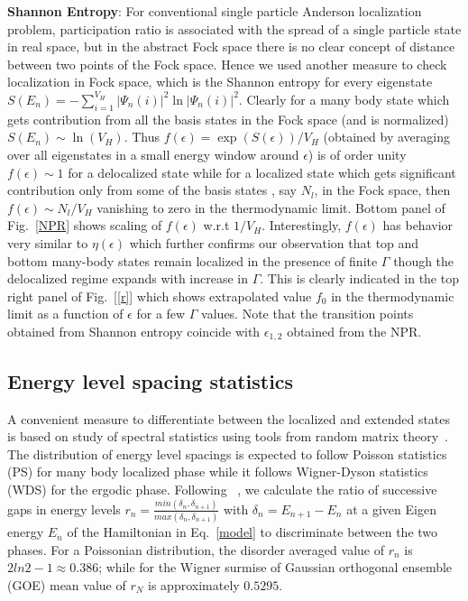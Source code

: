 \documentclass[prl,aps,twocolumn,floats,nofootinbib]{revtex4}
\begin{document}
{\bf{Shannon Entropy}}: For conventional single particle Anderson localization problem, participation ratio is associated with the spread of a single particle state in real space, but in the abstract Fock space there is no clear concept of distance between two points of the Fock space. Hence we used another measure to check localization in Fock space, which is the Shannon entropy for every eigenstate  $S(E_n)=-\sum_{i=1}^{V_H}|\Psi_n(i)|^2\ln|\Psi_n(i)|^2$. Clearly for a many body state which gets contribution from all the basis states in the Fock space (and is normalized) $S(E_n)\sim \ln(V_H)$. Thus $f(\epsilon)=\exp(S(\epsilon))/V_H$ (obtained by averaging over all eigenstates in a small energy window around $\epsilon$) is of  order unity $f(\epsilon) \sim 1$ for a delocalized state while for a localized state which gets significant contribution only from some of the basis states , say $N_l$, in the Fock space, then $f(\epsilon) \sim N_l/V_H$ vanishing to zero in the thermodynamic limit.
Bottom panel of Fig.~\ref{NPR} shows scaling of $f(\epsilon)$ w.r.t $1/V_H$. Interestingly, $f(\epsilon)$ has behavior very similar to $\eta(\epsilon)$ which further confirms our observation that top and bottom many-body states remain localized in the presence of finite $\Gamma$ though the delocalized regime expands with increase in $\Gamma$. This is clearly indicated in the top right panel of Fig.~[\ref{r}] which shows extrapolated value $f_0$ in the thermodynamic limit as a function of $\epsilon$ for a few $\Gamma$ values. Note that the transition points obtained from Shannon entropy coincide with $\epsilon_{1,2}$ obtained from the NPR.  

\subsection{Energy level spacing statistics}
A convenient measure to differentiate between the localized and extended states is based on study of spectral statistics using tools from random matrix theory~\cite{Mehta}. The distribution of energy level spacings is expected to follow Poisson statistics (PS) for many body localized phase while it follows Wigner-Dyson statistics (WDS) for the ergodic phase.  Following ~\cite{Husein}, we calculate the ratio of successive gaps in energy levels $r_n=\frac{min(\delta_n,\delta_{n+1})}{max(\delta_n,\delta_{n+1})}$ with $\delta_n=E_{n+1}-E_{n}$ at a given Eigen energy $E_n$ of the Hamiltonian in Eq.~\ref{model} to discriminate between the two phases. For a Poissonian distribution, the disorder averaged value of $r_n$ is $2ln2-1\approx 0.386$; while for the Wigner surmise of Gaussian orthogonal ensemble (GOE) mean value of $r_N$ is approximately $0.5295$. 
\end{document}
